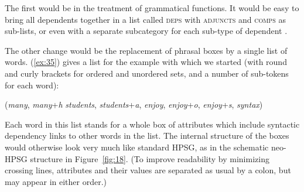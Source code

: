 \documentclass[output=paper
 	        ,biblatex
                ,babelshorthands
                ,newtxmath
                ,draftmode
                ,colorlinks, citecolor=brown
]{langscibook}
\begin{document}
The first would be in the treatment of grammatical functions. It would be easy to bring all
dependents together in a list called \textsc{deps} \citep{BMS2001a} with \textsc{adjuncts} and
\textsc{comps} as sub-lists, or even with a separate subcategory for each sub-type of dependent
\citep{Hellan2017}.

The other change would be the replacement of phrasal boxes by a single list of words. (\ref{ex:35})
gives a list for the example with which we started (with round and curly brackets for ordered and
unordered sets, and a number of sub-tokens for each word):

\begin{exe}
	\ex \label{ex:35} ({\emph{many}, \emph{many}+\emph{h}} {\emph{students}, \emph{students}+\emph{a}}, {\emph{enjoy}, \emph{enjoy}+\emph{o}, \emph{enjoy}+\emph{s}}, \emph{syntax})
\end{exe}

\noindent
Each word in this list stands for a whole box of attributes which include syntactic dependency links
to other words in the list. The internal structure of the boxes would otherwise look very much like
standard HPSG, as in the schematic neo-HPSG structure in Figure~\ref{fig:18}. (To improve
readability by minimizing crossing lines, attributes and their values are separated as usual by a
colon, but may appear in either order.)
\end{document}
